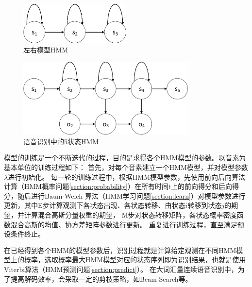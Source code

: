    \begin{figure}
    \centering
    \includegraphics[width=0.5\textwidth]{figures/chapter2/left_right-crop}
    \caption{左右模型HMM}
    \label{fig:left_right}
    \end{figure}

    \begin{figure}
    \centering
    \includegraphics[width=0.8\textwidth]{figures/chapter2/asr_hmm-crop}
    \caption{语音识别中的5状态HMM}
    \label{fig:asr_hmm}
    \end{figure}

    模型的训练是一个不断迭代的过程，目的是求得各个HMM模型的参数。以音素为基本单位的训练过程如下：
    首先，对每个音素建立一个HMM模型，并对模型参数$\lambda $进行初始化。
    每一轮的训练过程中，根据HMM模型参数，先使用前向后向算法计算（HMM概率问题\ref{section:probability}）在所有时间$t$上的前向得分和后向得分，随后进行Baum-Welch
    算法（HMM学习问题\ref{section:learn}）对模型参数进行更新，其中E步计算观测下各状态出现、各状态转移、由状态$i$转移到状态$j$的期望，并计算混合高斯分量权重的期望，
    M步对状态转移矩阵，各状态概率密度函数混合高斯的均值、协方差矩阵参数进行更新。
    重复进行训练过程，直至满足预设条件终止。

    在已经得到各个HMM的模型参数后，识别过程就是计算给定观测在不同HMM模型上的概率，选取概率最大HMM模型对应的状态序列即为识别结果，也就是使用Viterbi算法（HMM预测问题\ref{section:predict}）。
    在大词汇量连续语音识别中，为了提高解码效率，会采取一定的剪枝策略，如Beam Search等。

